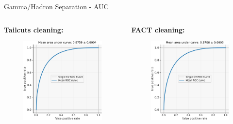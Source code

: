 \begin{frame}{Gamma/Hadron Separation - AUC}
    \begin{columns}[T] %
        \begin{column}{.48\textwidth}
            \textbf{Tailcuts cleaning:}
            \vspace{5pt}
            \begin{figure}
                \includegraphics[width=0.8\linewidth]{images/result_plots/tail1/sep_diff_1-crop.pdf}                
            \end{figure}
        \end{column}
        \begin{column}{.48\textwidth}
            \textbf{FACT cleaning:}
            \vspace{5pt}
            \begin{figure}
                \includegraphics[width=0.8\linewidth]{images/result_plots/fact2/sep_diff_1-crop.pdf}                
            \end{figure}
        \end{column}
    \end{columns}
\end{frame}

